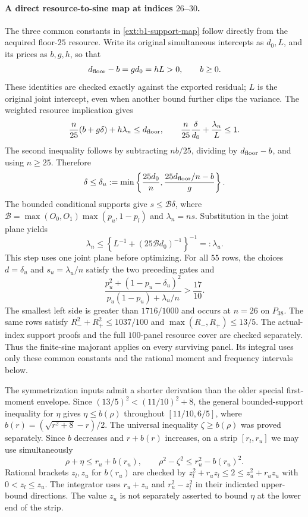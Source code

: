 \paragraph{A direct resource-to-sine map at indices $26$--$30$.}
The three common constants in \eqref{ext:b1-support-map} follow
directly from the acquired floor-$25$ resource.
Write its original simultaneous intercepts as $d_0,L$, and its prices
as $b,g,h$, so that
\[
 d_{\rm floor}-b=g d_0=hL>0,\qquad b\ge0.
\]
These identities are checked exactly against the exported residual;
$L$ is the original joint intercept, even when another bound further
clips the variance. The weighted resource implication gives
\[
 \frac n{25}(b+g\delta)+h\lambda_n\le d_{\rm floor},
 \qquad
 \frac n{25}\frac{\delta}{d_0}+\frac{\lambda_n}{L}\le1.
\]
The second inequality follows by subtracting $nb/25$, dividing by
$d_{\rm floor}-b$, and using $n\ge25$. Therefore
\[
 \delta\le \delta_u:=\min\left\{\frac{25d_0}{n},
                 \frac{25d_{\rm floor}/n-b}{g}\right\}.
\]
The bounded conditional supports give $s\le\mathcal B\delta$, where
$\mathcal B=\max(O_0,O_1)\max(p_u,1-p_l)$ and $\lambda_n=ns$.
Substitution in the joint plane yields
\[
 \lambda_n\le
 \left\{L^{-1}+(25\mathcal B d_0)^{-1}\right\}^{-1}=:\lambda_u.
\]
This step uses one joint plane before optimizing. For all $55$ rows,
the choices $d=\delta_u$ and $s_u=\lambda_u/n$ satisfy the two
preceding gates and
\[
 \frac{p_u^2+(1-p_u-\delta_u)^2}
      {p_u(1-p_u)+\lambda_u/n}>\frac{17}{10}.
\]
The smallest left side is greater than $1716/1000$ and occurs
at $n=26$ on $P_{38}$. The same rows satisfy
$R_-^2+R_+^2\le1037/100$ and $\max(R_-,R_+)\le13/5$.
The actual-index support proofs and the full $100$-panel resource
cover are checked separately. Thus the finite-sine majorant applies
on every surviving panel. Its integral uses only these common
constants and the rational moment and frequency intervals below.

The symmetrization inputs admit a shorter derivation than the older
special first-moment envelope. Since
$(13/5)^2< (11/10)^2+8$, the general bounded-support inequality
for $\eta$ gives $\eta\le b(\rho)$ throughout $[11/10,6/5]$,
where $b(r)=(\sqrt{r^2+8}-r)/2$.
The universal inequality $\zeta\ge b(\rho)$ was proved separately.
Since $b$ decreases and $r+b(r)$ increases, on a strip $[r_l,r_u]$
we may use simultaneously
\[
 \rho+\eta\le r_u+b(r_u),\qquad
 \rho^2-\zeta^2\le r_u^2-b(r_u)^2.
\]
Rational brackets $z_l,z_u$ for $b(r_u)$ are checked by
$z_l^2+r_uz_l\le2\le z_u^2+r_uz_u$ with $0<z_l\le z_u$.
The integrator uses $r_u+z_u$ and $r_u^2-z_l^2$ in their indicated
upper-bound directions. The value $z_u$ is not separately asserted
to bound $\eta$ at the lower end of the strip.

